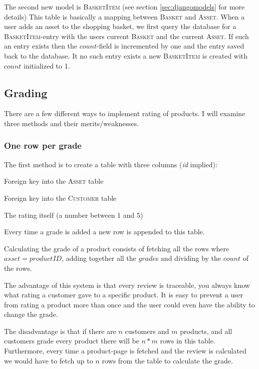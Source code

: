 \documentclass[12pt, a4paper,titlepage]{article}
\begin{document}
The second new model is \textsc{BasketItem} (see section
 \ref{sec:djangomodels} for more details)
This table is basically a mapping between \textsc{Basket} and \textsc{Asset}.
When a user adds an asset to the shopping basket, we first query the database
for a \textsc{BasketItem}-entry with the users current \textsc{Basket} and the 
current \textsc{Asset}. If such an entry exists then the $count$-field is
incremented by one and the entry saved back to the database.
It no such entry exists a new \textsc{BasketItem} is created with $count$
initialized to 1.


\subsection{Grading}

There are a few different ways to implement rating of products. I will examine
three methods and their merits/weaknesses.
\subsubsection{One row per grade}
The first method is to create a table with three columns (\emph{id} implied): 
\begin{description}
\setlength\itemsep{-7pt}
\item[asset] Foreign key into the \textsc{Asset} table
\item[customer] Foreign key into the \textsc{Customer} table
\item[grade] The rating itself (a number between 1 and 5)
\end{description}
Every time a grade is added a new row is appended to this table.

Calculating the grade of a product consists of fetching all the rows where 
$asset = productID$, adding together all the $grade$s and dividing by the
$count$ of the rows.

The advantage of this system is that every review is traceable, you always
know what rating a customer gave to a specific product. It is easy to prevent
a user from rating a product more than once and the user could even have the
ability to change the grade.

The disadvantage is that if there are $n$ customers and $m$ products, and all
customers grade every product there will be $n*m$ rows in this table.
Furthermore, every time a product-page is fetched and the review is calculated
we would have to fetch up to $n$ rows from the table to calculate the grade.
\end{document}
